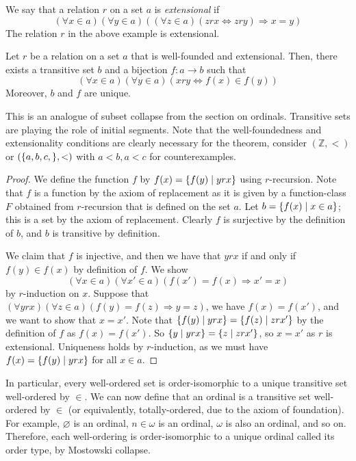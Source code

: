 We say that a relation \( r \) on a set \( a \) is \emph{extensional} if
\[ (\forall x \in a)(\forall y \in a)((\forall z \in a)(zrx \Leftrightarrow zry) \Rightarrow x = y) \]
The relation \( r \) in the above example is extensional.
\begin{theorem}
    Let \( r \) be a relation on a set \( a \) that is well-founded and extensional.
    Then, there exists a transitive set \( b \) and a bijection \( f \colon a \to b \) such that
    \[ (\forall x \in a)(\forall y \in a)(x r y \Leftrightarrow f(x) \in f(y)) \]
    Moreover, \( b \) and \( f \) are unique.
\end{theorem}
This is an analogue of subset collapse from the section on ordinals.
Transitive sets are playing the role of initial segments.
Note that the well-foundedness and extensionality conditions are clearly necessary for the theorem, consider \( (\mathbb Z, <) \) or \( (\qty{a,b,c,},<) \) with \( a<b, a<c \) for counterexamples.
\begin{proof}
    We define the function \( f \) by \( f(x) = \qty{f(y) \mid y r x} \) using \( r \)-recursion.
    Note that \( f \) is a function by the axiom of replacement as it is given by a function-class \( F \) obtained from \( r \)-recursion that is defined on the set \( a \).
    Let \( b = \qty{f(x) \mid x \in a} \); this is a set by the axiom of replacement.
    Clearly \( f \) is surjective by the definition of \( b \), and \( b \) is transitive by definition.

    We claim that \( f \) is injective, and then we have that \( yrx \) if and only if \( f(y) \in f(x) \) by definition of \( f \).
    We show
    \[ (\forall x \in a)(\forall x' \in a)(f(x') = f(x) \Rightarrow x' = x) \]
    by \( r \)-induction on \( x \).
    Suppose that \( (\forall y r x)(\forall z \in a)(f(y) = f(z) \Rightarrow y = z) \), we have \( f(x) = f(x') \), and we want to show that \( x = x' \).
    Note that \( \qty{f(y) \mid y r x} = \qty{f(z) \mid z r x'} \) by the definition of \( f \) as \( f(x) = f(x') \).
    So \( \qty{y \mid y r x} = \qty{z \mid z r x'} \), so \( x = x' \) as \( r \) is extensional.
    Uniqueness holds by \( r \)-induction, as we must have \( f(x) = \qty{f(y) \mid y r x} \) for all \( x \in a \).
\end{proof}
In particular, every well-ordered set is order-isomorphic to a unique transitive set well-ordered by \( \in \).
We can now define that an ordinal is a transitive set well-ordered by \( \in \) (or equivalently, totally-ordered, due to the axiom of foundation).
For example, \( \varnothing \) is an ordinal, \( n \in \omega \) is an ordinal, \( \omega \) is also an ordinal, and so on.
Therefore, each well-ordering is order-isomorphic to a unique ordinal called its order type, by Mostowski collapse.
